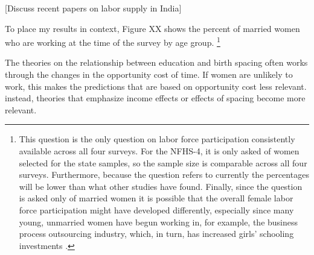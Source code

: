 [Discuss recent papers on labor supply in India]


To place my results in context, Figure XX shows the percent of married women who are 
working at the time of the survey by age group.%
\footnote{
This question is the only question on labor force participation consistently available 
across all four surveys.
For the NFHS-4, it is only asked of women selected for the state samples, so the
sample size is comparable across all four surveys.
Furthermore, because the question refers to currently the percentages will be lower than
what other studies have found.
Finally, since the question is asked only of married women it is possible that the overall
female labor force participation might have developed differently, especially since
many young, unmarried women have begun working in, for example, the business process 
outsourcing industry, which, in turn, has increased girls' schooling investments
\citep{Jensen2012}.
}


 
 





The theories on the relationship between education and birth spacing often works 
through the changes in the opportunity cost of time. 
If women are unlikely to work, this makes the predictions that are based on
opportunity cost less relevant. 
instead, theories that emphasize income effects or effects of spacing become
more relevant. 

